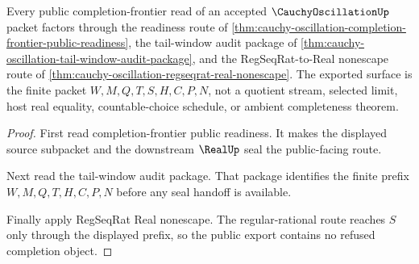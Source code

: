 \begin{theorem}
\label{thm:cauchy-oscillation-public-export-readiness}
Every public completion-frontier read of an accepted $\CauchyOscillationUp$ packet factors through the readiness route of \autoref{thm:cauchy-oscillation-completion-frontier-public-readiness}, the tail-window audit package of \autoref{thm:cauchy-oscillation-tail-window-audit-package}, and the RegSeqRat-to-Real nonescape route of \autoref{thm:cauchy-oscillation-regseqrat-real-nonescape}. The exported surface is the finite packet $W,M,Q,T,S,H,C,P,N$, not a quotient stream, selected limit, host real equality, countable-choice schedule, or ambient completeness theorem.
\end{theorem}
\begin{proof}
First read completion-frontier public readiness. It makes the displayed source subpacket and the downstream $\RealUp$ seal the public-facing route.

Next read the tail-window audit package. That package identifies the finite prefix $W,M,Q,T,H,C,P,N$ before any seal handoff is available.

Finally apply RegSeqRat Real nonescape. The regular-rational route reaches $S$ only through the displayed prefix, so the public export contains no refused completion object.
\end{proof}


\begin{closurestatus}{\CauchyOscillationUp}
  \theoryclosure{\matureClosure}
  \formalstatus{\unformalizedV}
\end{closurestatus}
